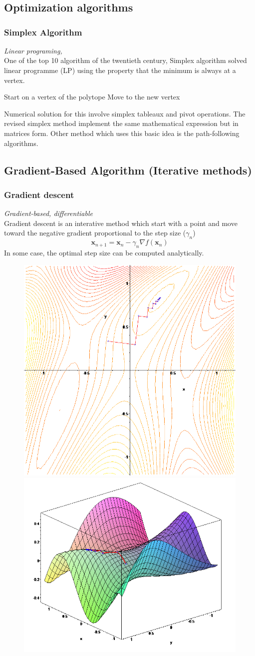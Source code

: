 \documentclass[twocolumn]{article}
\numberwithin{equation}{section}
\begin{document}
\newpage
\chapter{ }

\section{Optimization algorithms}
	\subsection{Simplex Algorithm}
\emph{Linear programing, }\\
One of the top 10 algorithm of the twentieth century, Simplex algorithm solved linear programme (LP) using the property that the minimum is always at a vertex.
\begin{framed}\begin{algorithmic}
\State Start on a vertex of the polytope
	\State Move to the new vertex
\EndWhile
\end{algorithmic}\end{framed}
Numerical solution for this involve simplex tableaux and pivot operations. The revised simplex method implement the same mathematical expression but in matrices form. Other method which uses this basic idea is the path-following algorithms.



\section{Gradient-Based Algorithm (Iterative methods)}

	\subsection{Gradient descent}
\emph{Gradient-based, differentiable}\\
Gradient descent is an interative method which start with a point and move toward the negative gradient proportional to the step size ($\gamma_n$)
$$\mathbf{x}_{n+1}=\mathbf{x}_n-\gamma_n \nabla f(\mathbf{x}_n)$$
In some case, the optimal step size can be computed analytically.
\begin{figure}[H]
	\centering
    \includegraphics[width=.16\textwidth]{Gradient_ascent_(contour).png}
    \includegraphics[width=.20\textwidth]{Gradient_ascent_(surface).png}
\end{figure}
\end{document}
